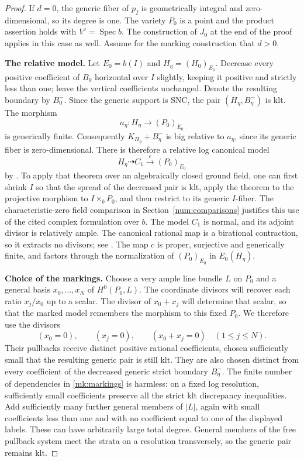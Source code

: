 \begin{proof}
If $d=0$, the generic fiber of $p_I$ is geometrically integral and
zero-dimensional, so its degree is one.  The variety $P_0$ is a point
and the product assertion holds with $V'=\operatorname{Spec}b$.
The construction of $J_0$ at the end of the proof applies in this case
as well.  Assume for the marking construction that $d>0$.

\smallskip\noindent\textbf{The relative model.}\enspace
Let $E_0=b(I)$ and $H_\eta=(H_0)_{E_0}$.  Decrease every positive
coefficient of $B_0$ horizontal over $I$ slightly, keeping it positive
and strictly less than one; leave the vertical coefficients unchanged.
Denote the resulting boundary by $B_0^-$.  Since the generic support is
SNC, the pair $(H_\eta,B_\eta^-)$ is klt.  The morphism
\[
 a_\eta:H_\eta\longrightarrow (P_0)_{E_0}
\]
is generically finite.  Consequently $K_{H_\eta}+B_\eta^-$ is big
relative to $a_\eta$, since its generic fiber is zero-dimensional.
There is therefore a relative log canonical model
\[
 H_\eta\dashrightarrow C_1\xrightarrow{\,c\,}(P_0)_{E_0}
\]
by \cite[Theorem~1.2(2)]{BCHM}.  To apply that theorem over an
algebraically closed ground field, one can first shrink $I$ so that the
spread of the decreased pair is klt, apply the theorem to the projective
morphism to $I\times_bP_0$, and then restrict to its generic $I$-fiber.
The characteristic-zero field comparison in
Section~\ref{num:comparisons} justifies this use of the cited complex
formulation over $b$. The model $C_1$ is normal, and its adjoint divisor is relatively ample.
The canonical rational map is a birational contraction, so it extracts
no divisors; see \cite[Definition~3.6.6]{BCHM}.  The map $c$ is proper,
surjective and generically finite, and factors through the normalization
of $(P_0)_{E_0}$ in $E_0(H_\eta)$.

\smallskip\noindent\textbf{Choice of the markings.}\enspace
Choose a very ample line bundle $L$ on $P_0$ and a general basis
$x_0,\ldots,x_N$ of $H^0(P_0,L)$. The coordinate divisors will
recover each ratio $x_j/x_0$ up to a scalar. The divisor of
$x_0+x_j$ will determine that scalar, so that the marked model
remembers the morphism to this fixed $P_0$. We therefore use
the divisors
\begin{equation}\label{mk:markings}
 (x_0=0),\qquad (x_j=0),\qquad (x_0+x_j=0)
 \quad (1\leq j\leq N).
\end{equation}
Their pullbacks receive distinct positive rational coefficients, chosen
sufficiently small that the resulting generic pair is still klt.  They
are also chosen distinct from every coefficient of the decreased generic
strict boundary $B_\eta^-$.  The finite number of dependencies in
\eqref{mk:markings} is harmless: on a fixed log resolution, sufficiently
small coefficients preserve all the strict klt discrepancy inequalities.
Add sufficiently many further general members of $|L|$, again with
small coefficients less than one and with no coefficient equal to one
of the displayed labels.  These can have arbitrarily large total degree.
General members of the free pullback system meet the strata on a
resolution transversely, so the generic pair remains klt.


\end{proof}
